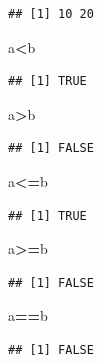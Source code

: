 \documentclass[
]{article}
\newenvironment{Shaded}{\begin{snugshade}}{\end{snugshade}}
\newcommand{\NormalTok}[1]{#1}
\newcommand{\SpecialCharTok}[1]{\textcolor[rgb]{0.81,0.36,0.00}{\textbf{#1}}}
\begin{document}
\begin{verbatim}
## [1] 10 20
\end{verbatim}

\begin{Shaded}
\begin{Highlighting}[]
\NormalTok{a}\SpecialCharTok{\textless{}}\NormalTok{b}
\end{Highlighting}
\end{Shaded}

\begin{verbatim}
## [1] TRUE
\end{verbatim}

\begin{Shaded}
\begin{Highlighting}[]
\NormalTok{a}\SpecialCharTok{\textgreater{}}\NormalTok{b}
\end{Highlighting}
\end{Shaded}

\begin{verbatim}
## [1] FALSE
\end{verbatim}

\begin{Shaded}
\begin{Highlighting}[]
\NormalTok{a}\SpecialCharTok{\textless{}=}\NormalTok{b}
\end{Highlighting}
\end{Shaded}

\begin{verbatim}
## [1] TRUE
\end{verbatim}

\begin{Shaded}
\begin{Highlighting}[]
\NormalTok{a}\SpecialCharTok{\textgreater{}=}\NormalTok{b}
\end{Highlighting}
\end{Shaded}

\begin{verbatim}
## [1] FALSE
\end{verbatim}

\begin{Shaded}
\begin{Highlighting}[]
\NormalTok{a}\SpecialCharTok{==}\NormalTok{b}
\end{Highlighting}
\end{Shaded}

\begin{verbatim}
## [1] FALSE
\end{verbatim}
\end{document}
